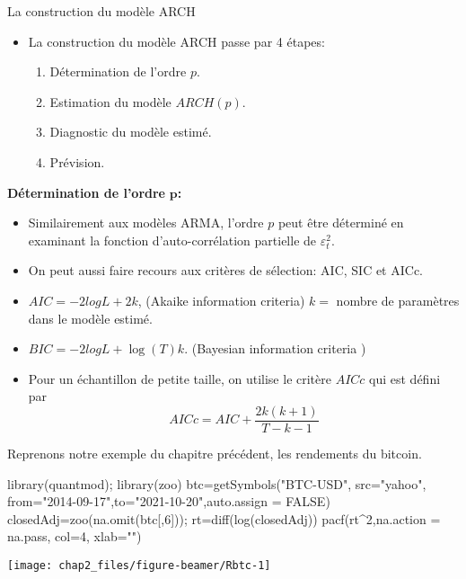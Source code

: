\documentclass[
  ignorenonframetext,
]{beamer}
\newenvironment{Shaded}{\begin{snugshade}}{\end{snugshade}}
\newcommand{\AttributeTok}[1]{\textcolor[rgb]{0.77,0.63,0.00}{#1}}
\newcommand{\ConstantTok}[1]{\textcolor[rgb]{0.00,0.00,0.00}{#1}}
\newcommand{\DecValTok}[1]{\textcolor[rgb]{0.00,0.00,0.81}{#1}}
\newcommand{\FunctionTok}[1]{\textcolor[rgb]{0.00,0.00,0.00}{#1}}
\newcommand{\NormalTok}[1]{#1}
\newcommand{\OtherTok}[1]{\textcolor[rgb]{0.56,0.35,0.01}{#1}}
\newcommand{\SpecialCharTok}[1]{\textcolor[rgb]{0.00,0.00,0.00}{#1}}
\newcommand{\StringTok}[1]{\textcolor[rgb]{0.31,0.60,0.02}{#1}}
\newenvironment{Shaded}{\begin{snugshade}}{\end{snugshade}}
\newcommand{\AttributeTok}[1]{\textcolor[rgb]{0.77,0.63,0.00}{#1}}
\newcommand{\ConstantTok}[1]{\textcolor[rgb]{0.00,0.00,0.00}{#1}}
\newcommand{\DecValTok}[1]{\textcolor[rgb]{0.00,0.00,0.81}{#1}}
\newcommand{\FunctionTok}[1]{\textcolor[rgb]{0.00,0.00,0.00}{#1}}
\newcommand{\NormalTok}[1]{#1}
\newcommand{\OtherTok}[1]{\textcolor[rgb]{0.56,0.35,0.01}{#1}}
\newcommand{\SpecialCharTok}[1]{\textcolor[rgb]{0.00,0.00,0.00}{#1}}
\newcommand{\StringTok}[1]{\textcolor[rgb]{0.31,0.60,0.02}{#1}}
\begin{document}
\begin{frame}{La construction du modèle ARCH}
\protect\hypertarget{la-construction-du-moduxe8le-arch}{}
\begin{itemize}[<+->]
\item
  La construction du modèle ARCH passe par 4 étapes:
  \begin{enumerate}[<+->]
  \item
    Détermination de l'ordre \(p\).
  \item
    Estimation du modèle \(ARCH(p)\).
  \item
    Diagnostic du modèle estimé.
  \item
    Prévision.
  \end{enumerate}
\end{itemize}
\end{frame}
\begin{frame}
\textbf{Détermination de l'ordre} \(\mathbf{p}\)\textbf{:}
\begin{itemize}[<+->]
\item
  Similairement aux modèles ARMA, l'ordre \(p\) peut être déterminé en
  examinant la fonction d'auto-corrélation partielle de
  \(\varepsilon_t^2\).
\item
  On peut aussi faire recours aux critères de sélection: AIC, SIC et
  AICc.
\item
  \(AIC=-2logL+2k\), (Akaike information criteria) \(k=\) nombre de
  paramètres dans le modèle estimé.
\item
  \(BIC=-2logL+\log(T)k\). (Bayesian information criteria )
\item
  Pour un échantillon de petite taille, on utilise le critère \(AICc\)
  qui est défini par \[
  AICc=AIC+\dfrac{2k(k+1)}{T-k-1}
  \]
\end{itemize}
\end{frame}
\begin{frame}[fragile]
Reprenons notre exemple du chapitre précédent, les rendements du
bitcoin.
\begin{Shaded}
\begin{Highlighting}[]
\FunctionTok{library}\NormalTok{(quantmod); }\FunctionTok{library}\NormalTok{(zoo)}
\NormalTok{btc}\OtherTok{=}\FunctionTok{getSymbols}\NormalTok{(}\StringTok{"BTC{-}USD"}\NormalTok{, }\AttributeTok{src=}\StringTok{"yahoo"}\NormalTok{, }\AttributeTok{from=}\StringTok{"2014{-}09{-}17"}\NormalTok{,}\AttributeTok{to=}\StringTok{"2021{-}10{-}20"}\NormalTok{,}\AttributeTok{auto.assign =} \ConstantTok{FALSE}\NormalTok{)}
\NormalTok{closedAdj}\OtherTok{=}\FunctionTok{zoo}\NormalTok{(}\FunctionTok{na.omit}\NormalTok{(btc[,}\DecValTok{6}\NormalTok{])); rt}\OtherTok{=}\FunctionTok{diff}\NormalTok{(}\FunctionTok{log}\NormalTok{(closedAdj))}
\FunctionTok{pacf}\NormalTok{(rt}\SpecialCharTok{\^{}}\DecValTok{2}\NormalTok{,}\AttributeTok{na.action =}\NormalTok{ na.pass, }\AttributeTok{col=}\DecValTok{4}\NormalTok{, }\AttributeTok{xlab=}\StringTok{""}\NormalTok{)}
\end{Highlighting}
\end{Shaded}
\begin{center}\texttt{[image: chap2\_files/figure-beamer/Rbtc-1]} \end{center}
\end{frame}
\end{document}
